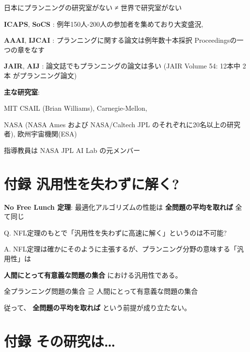 日本にプランニングの研究室がない ≠ 世界で研究室がない

\textbf{ICAPS}, \textbf{SoCS} : 例年150人-200人の参加者を集めており大変盛況, 

\textbf{AAAI}, \textbf{IJCAI} : プランニングに関する論文は例年数十本採択 Proceedingsの一つの章をなす

\textbf{JAIR}, \textbf{AIJ} : 論文誌でもプランニングの論文は多い (JAIR Volume 54: 12本中 2本 がプランニング論文)

\textbf{主な研究室}:

MIT CSAIL (Brian Williams), Carnegie-Mellon, 

NASA (NASA Ames および NASA/Caltech JPL のそれぞれに20名以上の研究者), 欧州宇宙機関(ESA)

指導教員は NASA JPL AI Lab の元メンバー

\section{付録 汎用性を失わずに解く?}
\label{sec-16}

\textbf{No Free Lunch 定理}: 最適化アルゴリズムの性能は \textbf{全問題の平均を取れば} 全て同じ

Q. NFL定理のもとで「汎用性を失わずに高速に解く」というのは不可能?

A. NFL定理は確かにそのように主張するが、プランニング分野の意味する「汎用性」は

\textbf{人間にとって有意義な問題の集合} における汎用性である。

\begin{center}
全プランニング問題の集合 ⊇ 人間にとって有意義な問題の集合
\end{center}

従って、 \textbf{全問題の平均を取れば} という前提が成り立たない。

\section{付録 その研究は\ldots{}}
\label{sec-17}




